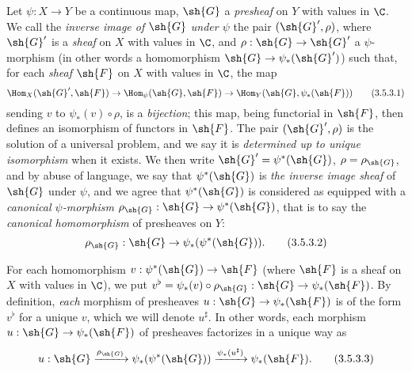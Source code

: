 \begin{env}[3.5.3]
\label{0.3.5.3}
Let $\psi:X\to Y$ be a continuous map, $\sh{G}$ a \emph{presheaf} on $Y$ with
values in $\C$. We call the \emph{inverse image of $\sh{G}$ under $\psi$} the
pair $(\sh{G}',\rho)$, where $\sh{G}'$ is a \emph{sheaf} on $X$ with values in
$\C$, and $\rho:\sh{G}\to\sh{G}'$ a $\psi$-morphism (in other words a
homomorphism $\sh{G}\to\psi_*(\sh{G}')$) such that, for each \emph{sheaf}
$\sh{F}$ on $X$ with values in $\C$, the map
\[
  \Hom_X(\sh{G}',\sh{F})\to\Hom_\psi(\sh{G},\sh{F})
  \to\Hom_Y(\sh{G},\psi_*(\sh{F}))
  \tag{3.5.3.1}
\]
sending $v$ to $\psi_*(v)\circ\rho$, is a \emph{bijection}; this map, being
functorial in $\sh{F}$, then defines an isomorphism of functors in $\sh{F}$. The
pair $(\sh{G}',\rho)$ is the solution of a universal problem, and we say it is
\emph{determined up to unique isomorphism} when it exists. We then write
$\sh{G}'=\psi^*(\sh{G})$, $\rho=\rho_\sh{G}$, and by abuse of language, we say
that $\psi^*(\sh{G})$ is \emph{the inverse image sheaf} of $\sh{G}$ under
$\psi$, and we agree that $\psi^*(\sh{G})$ is considered as equipped with a
\emph{canonical $\psi$-morphism $\rho_\sh{G}:\sh{G}\to\psi^*(\sh{G})$}, that is
to say the \emph{canonical homomorphism} of presheaves on $Y$:
\[
  \rho_\sh{G}:\sh{G}\to\psi_*(\psi^*(\sh{G})).
  \tag{3.5.3.2}
\]

For each homomorphism $v:\psi^*(\sh{G})\to\sh{F}$ (where $\sh{F}$ is a sheaf on
$X$ with values in $\C$), we put
$v^\flat=\psi_*(v)\circ\rho_\sh{G}:\sh{G}\to\psi_*(\sh{F})$. By definition,
\emph{each} morphism of presheaves $u:\sh{G}\to\psi_*(\sh{F})$ is of the form
$v^\flat$ for a unique $v$, which we will denote $u^\sharp$. In other words,
each morphism $u:\sh{G}\to\psi_*(\sh{F})$ of presheaves factorizes in a unique
way as
\[
  u:\sh{G}\xrightarrow{\rho_\sh{G}}\psi_*(\psi^*(\sh{G}))
  \xrightarrow{\psi_*(u^\sharp)}\psi_*(\sh{F}).
  \tag{3.5.3.3}
\]
\end{env}

